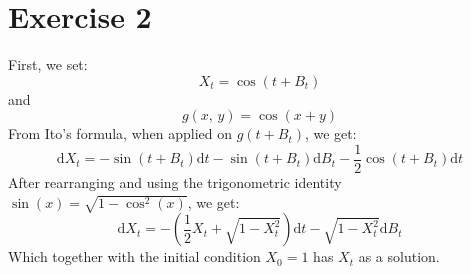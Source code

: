 \documentclass{article}
\theoremstyle{plain}
\theoremstyle{definition}
\theoremstyle{definition}
\theoremstyle{remark}
\newcommand{\diff}{\mathrm{d}}
\begin{document}
        \section{Exercise 2}
        First, we set:
        \begin{equation*}
            X_{t} = \cos \left(t + B_{t}\right)
        \end{equation*}
        and
        \begin{equation*}
            g \left(x,\,y\right) = \cos \left(x + y\right)
        \end{equation*}
        From Ito's formula, when applied on \(g \left(t+B_{t}\right)\), we get:
        \begin{equation*}
            \diff  X_{t} = -\sin \left(t + B_{t}\right) \diff t -\sin \left(t + B_{t}\right) \diff  B_{t} - \frac{1}{2} \cos \left(t + B_{t}\right) \diff t
        \end{equation*}
        After rearranging and using the trigonometric identity \(\sin \left(x\right) = \sqrt{1-\cos^{2} \left(x\right)}\), we get:
        \begin{equation*}
            \diff X_{t} = -\left(\frac{1}{2}X_{t}+\sqrt{1-X_{t}^{2}}\right)\diff t - \sqrt{1-X_{t}^{2}}\diff B_{t}
        \end{equation*}
        Which together with the initial condition \(X_{0}=1\) has \(X_{t}\) as a solution.
\end{document}
